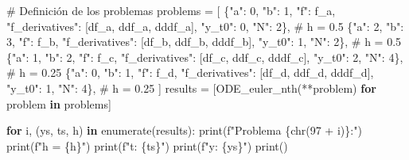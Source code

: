\documentclass[
  letterpaper,
  DIV=11,
  numbers=noendperiod]{scrartcl}
\newenvironment{Shaded}{\begin{snugshade}}{\end{snugshade}}
\newcommand{\BuiltInTok}[1]{\textcolor[rgb]{0.00,0.23,0.31}{#1}}
\newcommand{\CommentTok}[1]{\textcolor[rgb]{0.37,0.37,0.37}{#1}}
\newcommand{\ControlFlowTok}[1]{\textcolor[rgb]{0.00,0.23,0.31}{\textbf{#1}}}
\newcommand{\DecValTok}[1]{\textcolor[rgb]{0.68,0.00,0.00}{#1}}
\newcommand{\KeywordTok}[1]{\textcolor[rgb]{0.00,0.23,0.31}{\textbf{#1}}}
\newcommand{\NormalTok}[1]{\textcolor[rgb]{0.00,0.23,0.31}{#1}}
\newcommand{\OperatorTok}[1]{\textcolor[rgb]{0.37,0.37,0.37}{#1}}
\newcommand{\SpecialCharTok}[1]{\textcolor[rgb]{0.37,0.37,0.37}{#1}}
\newcommand{\SpecialStringTok}[1]{\textcolor[rgb]{0.13,0.47,0.30}{#1}}
\newcommand{\StringTok}[1]{\textcolor[rgb]{0.13,0.47,0.30}{#1}}
\begin{document}
\begin{Shaded}
\begin{Highlighting}[]
\CommentTok{\# Definición de los problemas}
\NormalTok{problems }\OperatorTok{=}\NormalTok{ [}
\NormalTok{    \{}\StringTok{"a"}\NormalTok{: }\DecValTok{0}\NormalTok{, }\StringTok{"b"}\NormalTok{: }\DecValTok{1}\NormalTok{, }\StringTok{"f"}\NormalTok{: f\_a, }\StringTok{"f\_derivatives"}\NormalTok{: [df\_a, ddf\_a, dddf\_a], }\StringTok{"y\_t0"}\NormalTok{: }\DecValTok{0}\NormalTok{, }\StringTok{"N"}\NormalTok{: }\DecValTok{2}\NormalTok{\},   }\CommentTok{\# h = 0.5}
\NormalTok{    \{}\StringTok{"a"}\NormalTok{: }\DecValTok{2}\NormalTok{, }\StringTok{"b"}\NormalTok{: }\DecValTok{3}\NormalTok{, }\StringTok{"f"}\NormalTok{: f\_b, }\StringTok{"f\_derivatives"}\NormalTok{: [df\_b, ddf\_b, dddf\_b], }\StringTok{"y\_t0"}\NormalTok{: }\DecValTok{1}\NormalTok{, }\StringTok{"N"}\NormalTok{: }\DecValTok{2}\NormalTok{\},   }\CommentTok{\# h = 0.5}
\NormalTok{    \{}\StringTok{"a"}\NormalTok{: }\DecValTok{1}\NormalTok{, }\StringTok{"b"}\NormalTok{: }\DecValTok{2}\NormalTok{, }\StringTok{"f"}\NormalTok{: f\_c, }\StringTok{"f\_derivatives"}\NormalTok{: [df\_c, ddf\_c, dddf\_c], }\StringTok{"y\_t0"}\NormalTok{: }\DecValTok{2}\NormalTok{, }\StringTok{"N"}\NormalTok{: }\DecValTok{4}\NormalTok{\},   }\CommentTok{\# h = 0.25}
\NormalTok{    \{}\StringTok{"a"}\NormalTok{: }\DecValTok{0}\NormalTok{, }\StringTok{"b"}\NormalTok{: }\DecValTok{1}\NormalTok{, }\StringTok{"f"}\NormalTok{: f\_d, }\StringTok{"f\_derivatives"}\NormalTok{: [df\_d, ddf\_d, dddf\_d], }\StringTok{"y\_t0"}\NormalTok{: }\DecValTok{1}\NormalTok{, }\StringTok{"N"}\NormalTok{: }\DecValTok{4}\NormalTok{\},   }\CommentTok{\# h = 0.25}
\NormalTok{]}
\NormalTok{results }\OperatorTok{=}\NormalTok{ [ODE\_euler\_nth(}\OperatorTok{**}\NormalTok{problem) }\ControlFlowTok{for}\NormalTok{ problem }\KeywordTok{in}\NormalTok{ problems]}

\ControlFlowTok{for}\NormalTok{ i, (ys, ts, h) }\KeywordTok{in} \BuiltInTok{enumerate}\NormalTok{(results):}
    \BuiltInTok{print}\NormalTok{(}\SpecialStringTok{f"Problema }\SpecialCharTok{\{}\BuiltInTok{chr}\NormalTok{(}\DecValTok{97} \OperatorTok{+}\NormalTok{ i)}\SpecialCharTok{\}}\SpecialStringTok{:"}\NormalTok{)}
    \BuiltInTok{print}\NormalTok{(}\SpecialStringTok{f"h = }\SpecialCharTok{\{}\NormalTok{h}\SpecialCharTok{\}}\SpecialStringTok{"}\NormalTok{)}
    \BuiltInTok{print}\NormalTok{(}\SpecialStringTok{f"t: }\SpecialCharTok{\{}\NormalTok{ts}\SpecialCharTok{\}}\SpecialStringTok{"}\NormalTok{)}
    \BuiltInTok{print}\NormalTok{(}\SpecialStringTok{f"y: }\SpecialCharTok{\{}\NormalTok{ys}\SpecialCharTok{\}}\SpecialStringTok{"}\NormalTok{)}
    \BuiltInTok{print}\NormalTok{()}
\end{Highlighting}
\end{Shaded}
\end{document}
